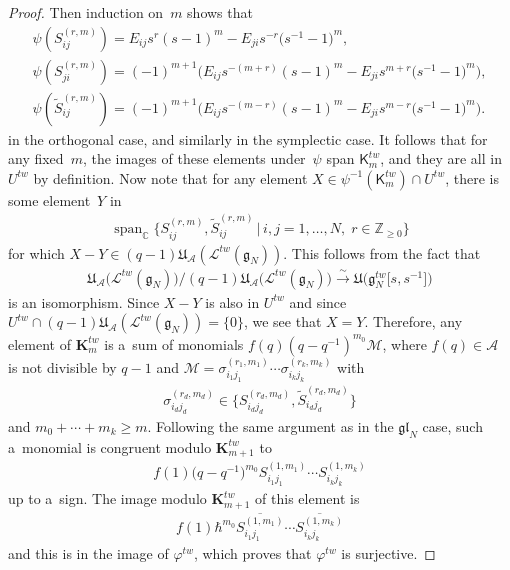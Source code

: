 \documentclass[11pt]{article}
\numberwithin{theorem}{section}
\numberwithin{proposition}{section}
\numberwithin{lemma}{section}
\numberwithin{corollary}{section}
\numberwithin{definition}{section}
\numberwithin{example}{section}
\numberwithin{remark}{section}
\numberwithin{note}{section}
\numberwithin{equation}{section}
\begin{document}
\begin{proof}
Then induction on~$m$ shows that
\begin{gather*}
\psi(S_{ij}^{(r,m)})=E_{ij}s^r(s-1)^m - E_{ji}s^{-r}\big(s^{-1}-1\big)^m,\\
\psi(S_{ji}^{(r,m)})=(-1)^{m+1}\big(E_{ij}s^{-(m+r)}(s-1)^m - E_{ji}s^{m+r}\big(s^{-1}-1\big)^m\big),\\
\psi(\widetilde{S}_{ij}^{(r,m)})=(-1)^{m+1}\big(E_{ij}s^{-(m-r)}(s-1)^m - E_{ji}s^{m-r}\big(s^{-1}-1\big)^m\big).
\end{gather*}
in the orthogonal case, and similarly in the symplectic case.
It follows that for any f\/ixed~$m$, the images of these elements under~$\psi$ span $\mathsf{K}_m^{tw}$, and they are all
in $U^{tw}$ by def\/inition.
Now note that for any element $X \in \psi^{-1}(\mathsf{K}_m^{tw}) \cap U^{tw}$, there is some element~$Y$ in
 \begin{gather*}
 \operatorname{span}_{\mathbb{C}} \big\{S_{ij}^{(r,m)},\widetilde{S}_{ij}^{(r,m)} \,|\, i,j=1,\ldots,N,\; r \in \mathbb{Z}_{\ge 0}\big\}
 \end{gather*}
for which $X-Y \in (q-1)\mathfrak{U}_{\mathcal{A}}(\mathcal{L}^{tw}(\mathfrak{g}_N))$.
This follows from the fact that
\begin{gather*}
\mathfrak{U}_{\mathcal{A}}\big(\mathcal{L}^{tw}(\mathfrak{g}_N)\big)/(q-1)\mathfrak{U}_{\mathcal{A}}\big(\mathcal{L}^{tw}(\mathfrak{g}_N)\big)
\stackrel{\sim}{\longrightarrow} \mathfrak{U}\big(\mathfrak{g}_N^{tw}\big[s,s^{-1}\big]\big)
\end{gather*}
is an isomorphism.
Since $X-Y$ is also in $U^{tw}$ and since $U^{tw} \cap
(q-1)\mathfrak{U}_{\mathcal{A}}(\mathcal{L}^{tw}(\mathfrak{g}_N))=\{0\}$, we see that $X=Y$.
Therefore, any element of $\mathbf{K}_m^{tw}$ is a~sum of monomials $f(q)(q-q^{-1})^{m_0}\mathcal{M}$, where $f(q) \in
\mathcal{A}$ is not divisible by $q-1$ and $\mathcal{M}=\sigma_{i_1 j_1}^{(r_1,m_1)} \cdots \sigma_{i_k j_k}^{(r_k,m_k)}$ with
\begin{gather*}
\sigma_{i_d j_d}^{(r_d,m_d)} \in \big\{S_{i_d j_d}^{(r_d,m_d)},\widetilde{S}_{i_d j_d}^{(r_d,m_d)}\big\}
\end{gather*}
and $m_0+\cdots+m_k \geq m$.
Following the same argument as in the $\mathfrak{gl}_N$ case, such a~monomial is congruent modulo
$\mathbf{K}_{m+1}^{tw}$ to
\begin{gather*}
f(1)\big(q-q^{-1}\big)^{m_0}S_{i_1 j_1}^{(1,m_1)} \cdots S_{i_k j_k}^{(1,m_k)}
\end{gather*}
up to a~sign.
The image modulo $\mathbf{K}_{m+1}^{tw}$ of this element is
\begin{gather*}
f(1)\hbar^{m_0}\overline{S_{i_1 j_1}^{(1,m_1)}} \cdots \overline{S_{i_k j_k}^{(1,m_k)}}
\end{gather*}
and this is in the image of $\varphi^{tw}$, which proves that $\varphi^{tw}$ is surjective.
\end{proof}
\end{document}
